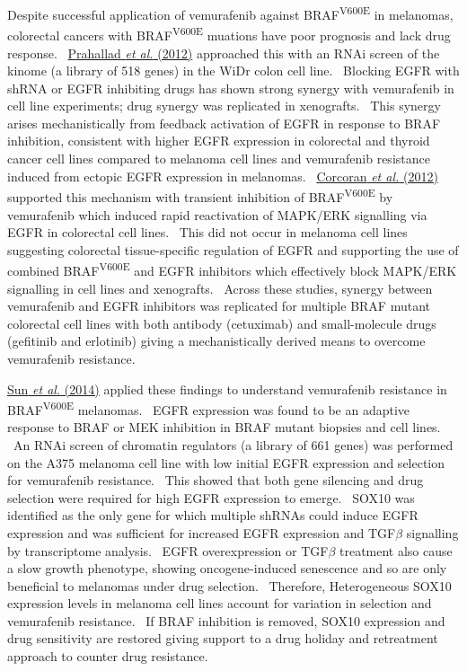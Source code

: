 Despite successful application of vemurafenib against BRAF\textsuperscript{V600E} in melanomas, colorectal cancers with BRAF\textsuperscript{V600E} muations have poor prognosis and lack drug response. \ \hyperlink{ENREF80}{Prahallad}\hyperlink{ENREF80}{\textit{ et al.}}\hyperlink{ENREF80}{ (2012)} approached this with an RNAi screen of the kinome (a library of 518 genes) in the WiDr colon cell line. \ Blocking EGFR with shRNA or EGFR inhibiting drugs has shown strong synergy with vemurafenib in cell line experiments; drug synergy was replicated in xenografts. \ This synergy arises mechanistically from feedback activation of EGFR in response to BRAF inhibition, consistent with higher EGFR expression in colorectal and thyroid cancer cell lines compared to melanoma cell lines and vemurafenib resistance induced from ectopic EGFR expression in melanomas. \ \hyperlink{ENREF24}{Corcoran}\hyperlink{ENREF24}{\textit{ et al.}}\hyperlink{ENREF24}{ (2012)} supported this mechanism with transient inhibition of BRAF\textsuperscript{V600E} by vemurafenib which induced rapid reactivation of MAPK/ERK signalling via EGFR in colorectal cell lines. \ This did not occur in melanoma cell lines suggesting colorectal tissue-specific regulation of EGFR and supporting the use of combined BRAF\textsuperscript{V600E} and EGFR inhibitors which effectively block MAPK/ERK signalling in cell lines and xenografts. \ Across these studies, synergy between vemurafenib and EGFR inhibitors was replicated for multiple BRAF mutant colorectal cell lines with both antibody (cetuximab) and small-molecule drugs (gefitinib and erlotinib) giving a mechanistically derived means to overcome vemurafenib resistance. \  

\hyperlink{ENREF92}{Sun}\hyperlink{ENREF92}{\textit{ et al.}}\hyperlink{ENREF92}{ (2014)} applied these findings to understand vemurafenib resistance in BRAF\textsuperscript{V600E} melanomas. \ EGFR expression was found to be an adaptive response to BRAF or MEK inhibition in BRAF mutant biopsies and cell lines. \ An RNAi screen of chromatin regulators (a library of 661 genes) was performed on the A375 melanoma cell line with low initial EGFR expression and selection for vemurafenib resistance. \ This showed that both gene silencing and drug selection were required for high EGFR expression to emerge. \ SOX10 was identified as the only gene for which multiple shRNAs could induce EGFR expression and was sufficient for increased EGFR expression and TGF$\beta $ signalling by transcriptome analysis. \ EGFR overexpression or TGF$\beta $ treatment also cause a slow growth phenotype, showing oncogene-induced senescence and so are only beneficial to melanomas under drug selection. \ Therefore, Heterogeneous SOX10 expression levels in melanoma cell lines account for variation in selection and vemurafenib resistance. \ If BRAF inhibition is removed, SOX10 expression and drug sensitivity are restored giving support to a drug holiday and retreatment approach to counter drug resistance. \  

